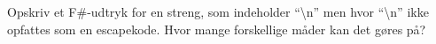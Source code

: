 Opskriv et F\#-udtryk for en streng, som indeholder ``\textbackslash n'' men hvor ``\textbackslash n'' ikke opfattes som en escapekode. Hvor mange forskellige måder kan det gøres på?

